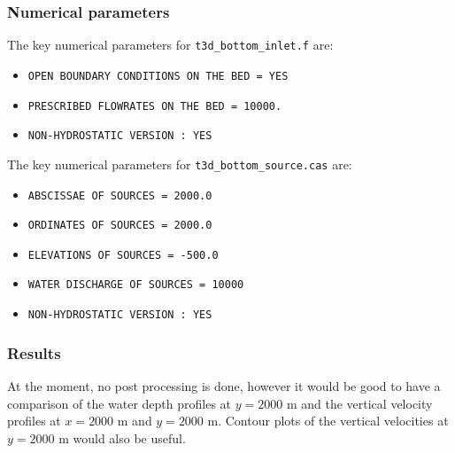 %
%
\subsubsection{Numerical parameters}
%
The key numerical parameters for \texttt{t3d\_bottom\_inlet.f} are:

\begin{itemize}
\item \texttt{OPEN BOUNDARY CONDITIONS ON THE BED = YES}
\item \texttt{PRESCRIBED FLOWRATES ON THE BED = 10000.}
\item \texttt{NON-HYDROSTATIC VERSION : YES}
\end{itemize}

The key numerical parameters for \texttt{t3d\_bottom\_source.cas} are:

\begin{itemize}
\item \texttt{ABSCISSAE OF SOURCES = 2000.0}
\item \texttt{ORDINATES OF SOURCES = 2000.0}
\item \texttt{ELEVATIONS OF SOURCES = -500.0}
\item \texttt{WATER DISCHARGE OF SOURCES = 10000}
\item \texttt{NON-HYDROSTATIC VERSION : YES}
\end{itemize}

%
%
\subsubsection{Results}
%
At the moment, no post processing is done, however it would be good to have a
comparison of the water depth profiles at $y=2000$ m and the vertical velocity
profiles at $x=2000$ m and $y=2000$ m. Contour plots of the vertical velocities
at $y=2000$ m would also be useful.



